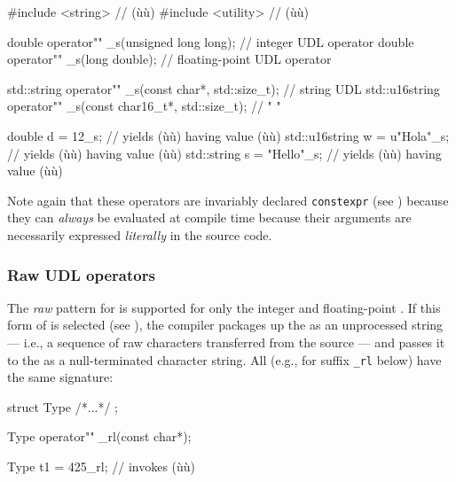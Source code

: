 \begin{emcppslisting}
#include <string>   // (ù{}ù)
#include <utility>  // (ù{}ù)

double operator"" _s(unsigned long long);  // integer UDL operator
double operator"" _s(long double);         // floating-point UDL operator

std::string    operator"" _s(const char*,     std::size_t);  // string UDL
std::u16string operator"" _s(const char16_t*, std::size_t);  //   "     "

double         d = 12_s;       // yields (ù{}ù) having value (ù{}ù)
std::u16string w = u"Hola"_s;  // yields (ù{}ù) having value (ù{}ù)
std::string    s = "Hello"_s;  // yields (ù{}ù) having value (ù{}ù)
\end{emcppslisting}

\noindent Note again that these operators are invariably declared
\lstinline!constexpr! (see )
because they can \emph{always} be evaluated at compile time because
their arguments are necessarily expressed \emph{literally} in the source
code.

\subsubsection[Raw UDL operators]{Raw UDL operators}\label{raw-udl-operators}

The \emph{raw} pattern for  is supported for only
the integer and floating-point . If this
form of  is selected (see ), the compiler packages up the  as an
unprocessed string --- i.e., a sequence of raw characters transferred
from the source --- and passes it to the  as a
null-terminated character string. All  (e.g.,
for suffix \lstinline!_rl! below) have the same signature:

\begin{emcppslisting}
struct Type { /*...*/ };

Type operator"" _rl(const char*);

Type t1 = 425_rl;  // invokes (ù{}ù)
\end{emcppslisting}

